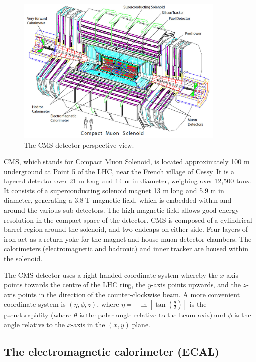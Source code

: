 \documentclass[10pt]{article}
\begin{document}
\begin{figure}[h]
  \centering
  \includegraphics[width=0.9\textwidth]{"CMSExploded"}
  \caption{The CMS detector perspective view.}
  \label{cms}
\end{figure}
CMS, which stands for Compact Muon Solenoid, is located approximately 100 m underground at Point 5 of the LHC, near the French village of Cessy. It is a layered detector over 21 m long and 14 m in diameter, weighing over 12,500 tons. It consists of a superconducting solenoid magnet 13 m long and 5.9 m in diameter, generating a 3.8 T magnetic field, which is embedded within and around the various sub-detectors. The high magnetic field allows good energy resolution in the compact space of the detector. CMS is composed of a cylindrical barrel region around the solenoid, and two endcaps on either side. Four layers of iron act as a return yoke for the magnet and house muon detector chambers. The calorimeters (electromagnetic and hadronic) and inner tracker are housed within the solenoid. 


The CMS detector uses a right-handed coordinate system whereby the $x$-axis points towards the centre of the LHC ring, the $y$-axis points upwards, and the $z$-axis points in the direction of the counter-clockwise beam. A more convenient coordinate system is $(\eta,\phi,z)$, where $\eta = -\ln [ \tan(\frac{\theta}{2})]$ is the pseudorapidity (where $\theta$ is the polar angle relative to the beam axis) and $\phi$ is the angle relative to the $x$-axis in the $(x,y)$ plane.
\newpage
\subsection{The electromagnetic calorimeter (ECAL)}
\end{document}
